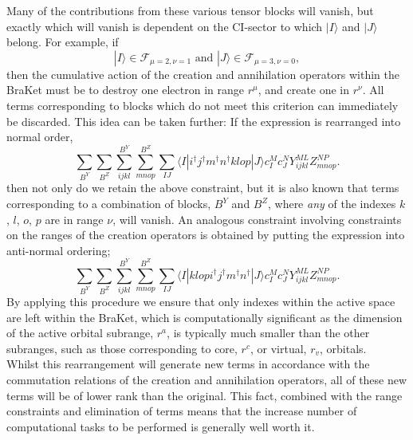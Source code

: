 \noindent Many of the contributions from these various tensor blocks will
vanish, but exactly which will vanish is dependent on the CI-sector to which
$|I \rangle$ and $|J \rangle$ belong. For example, if 
\begin{equation*}
|I\rangle \in \mathcal{F}_{\mu = 2,\nu = 1} \text{ \ \ \ \ and  \ \ \ \ } |J\rangle \in \mathcal{F}_{\mu = 3,\nu = 0},
\end{equation*}
then the cumulative action of the creation and annihilation operators within
the BraKet must be to destroy one electron in range $r^{\mu}$, and create one
in $r^{\nu}$. All terms corresponding to blocks which do not meet this
criterion can immediately be discarded. This idea can be taken further: If the
expression is rearranged into normal order,
\begin{equation}
\sum_{B^{Y}}\sum_{B^{Z}}
\sum^{B^{Y}}_{ijkl}\sum^{B^{Z}}_{mnop} \sum_{IJ} \langle I | i^{\dagger}j^{\dagger}m^{\dagger}n^{\dagger}klop | J \rangle c^{M}_{I} c_{J}^{N} Y^{ML}_{ijkl}Z^{NP}_{mnop}.
\label{eqn:basic_term_nordered}
\end{equation}
\noindent then not only do we retain the above constraint, but it is also known
that terms corresponding to a combination of blocks, $B^{Y}$ and $B^{Z}$, where
\emph{any} of the indexes $k$, $l$, $o$, $p$ are in range $\nu$, will vanish.
An analogous constraint involving constraints on the ranges of the creation 
operators is obtained by putting the expression into anti-normal ordering;
\begin{equation}
\sum_{B^{Y}}\sum_{B^{Z}}
\sum^{B^{Y}}_{ijkl}\sum^{B^{Z}}_{mnop} \sum_{IJ} \langle I |klop i^{\dagger}j^{\dagger}m^{\dagger}n^{\dagger} | J \rangle c^{M}_{I} c_{J}^{N} Y^{ML}_{ijkl}Z^{NP}_{mnop}.
\label{eqn:basic_term_anordered}
\end{equation}
\noindent By applying this procedure we ensure that only indexes within the
active space are left within the BraKet, which is computationally significant
as the dimension of the active orbital subrange, $r^{a}$, is typically much
smaller than the other subranges, such as those corresponding to core, $r^{c}$, or virtual, $r_{v}$, orbitals.\\

\noindent Whilst this rearrangement will generate new terms in accordance with
the commutation relations of the creation and annihilation operators, all of
these new terms will be of lower rank than the original.  This fact, combined
with the range constraints and elimination of terms means that the increase
number of computational tasks to be performed is generally well worth it.\\  

